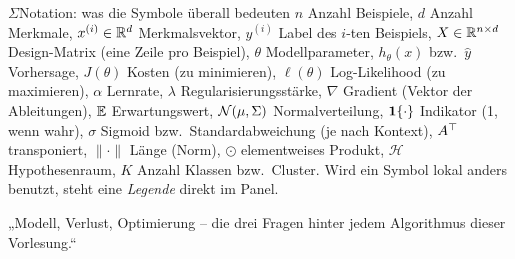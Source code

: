 \begin{hngrid}
\begin{hnp}[raster multicolumn=6,acc=hnnavy]{$\Sigma$}{Notation: was die Symbole überall bedeuten}
$n$ Anzahl Beispiele, $d$ Anzahl Merkmale, $x^{(i)}\in\mathbb{R}^d$ Merkmalsvektor, $y^{(i)}$ Label des $i$-ten Beispiels, $X\in\mathbb{R}^{n\times d}$ Design-Matrix (eine Zeile pro Beispiel), $\theta$ Modellparameter, $h_\theta(x)$ bzw.\ $\hat y$ Vorhersage, $J(\theta)$ Kosten (zu minimieren), $\ell(\theta)$ Log-Likelihood (zu maximieren), $\alpha$ Lernrate, $\lambda$ Regularisierungsstärke, $\nabla$ Gradient (Vektor der Ableitungen), $\mathbb{E}$ Erwartungswert, $\mathcal{N}(\mu,\Sigma)$ Normalverteilung, $\mathbf{1}\{\cdot\}$ Indikator (1, wenn wahr), $\sigma$ Sigmoid bzw.\ Standardabweichung (je nach Kontext), $A^{\top}$ transponiert, $\|\cdot\|$ Länge (Norm), $\odot$ elementweises Produkt, $\mathcal H$ Hypothesenraum, $K$ Anzahl Klassen bzw.\ Cluster. Wird ein Symbol lokal anders benutzt, steht eine \emph{Legende} direkt im Panel.
\end{hnp}
%
\begin{hnbanner}[raster multicolumn=6]
„Modell, Verlust, Optimierung -- die drei Fragen hinter jedem Algorithmus dieser Vorlesung.“
\end{hnbanner}
\end{hngrid}

